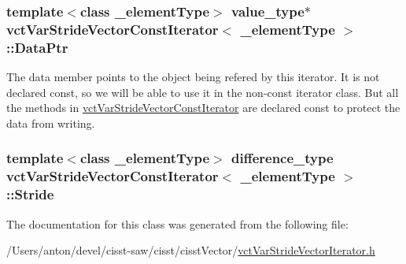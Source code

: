 \subsubsection[{Data\+Ptr}]{\setlength{\rightskip}{0pt plus 5cm}template$<$class \+\_\+element\+Type$>$ value\+\_\+type$\ast$ {\bf vct\+Var\+Stride\+Vector\+Const\+Iterator}$<$ \+\_\+element\+Type $>$\+::Data\+Ptr\hspace{0.3cm}{\ttfamily [protected]}}\label{classvct_var_stride_vector_const_iterator_a0aed102854d3d3a2c15214f55640c1b2}
The data member points to the object being refered by this iterator. It is not declared const, so we will be able to use it in the non-\/const iterator class. But all the methods in \hyperlink{classvct_var_stride_vector_const_iterator}{vct\+Var\+Stride\+Vector\+Const\+Iterator} are declared const to protect the data from writing. \hypertarget{classvct_var_stride_vector_const_iterator_a0b2bb6ca56af29cbf73c6874e86c367e}{}
\subsubsection[{Stride}]{\setlength{\rightskip}{0pt plus 5cm}template$<$class \+\_\+element\+Type$>$ difference\+\_\+type {\bf vct\+Var\+Stride\+Vector\+Const\+Iterator}$<$ \+\_\+element\+Type $>$\+::Stride\hspace{0.3cm}{\ttfamily [protected]}}\label{classvct_var_stride_vector_const_iterator_a0b2bb6ca56af29cbf73c6874e86c367e}


The documentation for this class was generated from the following file\+:\begin{DoxyCompactItemize}
\item 
/\+Users/anton/devel/cisst-\/saw/cisst/cisst\+Vector/\hyperlink{vct_var_stride_vector_iterator_8h}{vct\+Var\+Stride\+Vector\+Iterator.\+h}\end{DoxyCompactItemize}

